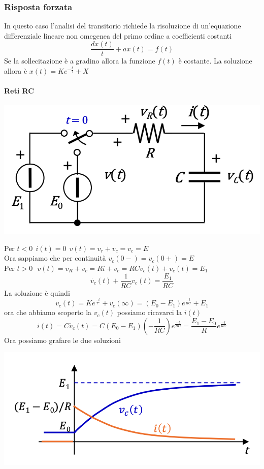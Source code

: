 \documentclass{article}
\theoremstyle{definition}
\begin{document}
\subsubsection{Risposta forzata}
In questo caso l'analisi del transitorio richiede la risoluzione di un'equazione differenziale lineare non omegenea del primo ordine a coefficienti costanti $$\frac{dx(t)}{t}+ax(t)=f(t)$$
Se la sollecitazione è a gradino allora la funzione $f(t)$ è costante. 
La soluzione allora è $x(t)=Ke^{-\frac{t}{\tau}}+X$
\paragraph{Reti RC}
\begin{center}
	\includegraphics[scale=0.35]{immagini/rcf}
\end{center}
Per $t<0 \ \ i(t)=0 \ \ v(t)=v_r+v_c=v_c=E$\\
Ora sappiamo che per continuità $v_c(0-) =v_c(0+)=E$ \\
Per $t>0 \ \ \ v(t)=v_R+v_c=Ri+v_c=RC\dot{v_c}(t)+v_c(t)=E_1$
$$\dot{v_c}(t)+\frac{1}{RC}v_c(t)=\frac{E_1}{RC}$$
La soluzione è quindi $$v_c(t)=Ke^{\frac{-t}{\tau}}+v_c(\infty)=(E_0-E_1)e^{\frac{-t}{RC}}+E_1$$
ora che abbiamo scoperto la $v_c(t)$ possiamo ricavarci la $i(t)$
$$i(t)=C \dot{v_c}(t)=C (E_0-E_1)(-\frac{1}{RC})e^{\frac{-t}{RC}}=\frac{E_1-E_0}{R}e^{\frac{-t}{RC}}$$
Ora possiamo grafare le due soluzioni 
\begin{center}
	\includegraphics[scale=0.45]{immagini/gcf}
\end{center}
\end{document}

